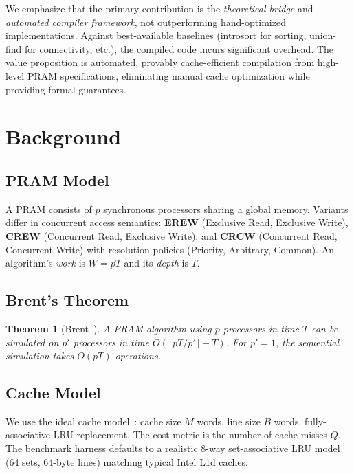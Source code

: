 \documentclass[11pt]{article}
\newtheorem{theorem}{Theorem}
\begin{document}
We emphasize that the primary contribution is the \emph{theoretical
bridge} and \emph{automated compiler framework}, not outperforming
hand-optimized implementations.  Against best-available baselines
(introsort for sorting, union-find for connectivity, etc.), the
compiled code incurs significant overhead.  The value proposition is
automated, provably cache-efficient compilation from high-level PRAM
specifications, eliminating manual cache optimization while providing
formal guarantees.

\section{Background}
\label{sec:background}

\subsection{PRAM Model}

A PRAM consists of $p$ synchronous processors sharing a global memory.
Variants differ in concurrent access semantics:
\textbf{EREW} (Exclusive Read, Exclusive Write),
\textbf{CREW} (Concurrent Read, Exclusive Write), and
\textbf{CRCW} (Concurrent Read, Concurrent Write) with resolution policies
(Priority, Arbitrary, Common).  An algorithm's \emph{work} is $W = pT$
and its \emph{depth} is $T$.

\subsection{Brent's Theorem}

\begin{theorem}[Brent~\cite{brent1974parallel}]
A PRAM algorithm using $p$ processors in time $T$ can be simulated on
$p'$ processors in time $O(\lceil pT/p' \rceil + T)$.  For $p' = 1$,
the sequential simulation takes $O(pT)$ operations.
\end{theorem}

\subsection{Cache Model}

We use the ideal cache model~\cite{frigo1999cache}: cache size $M$ words,
line size $B$ words, fully-associative LRU replacement.  The cost metric
is the number of cache misses $Q$.  The benchmark harness defaults to a
realistic 8-way set-associative LRU model (64 sets, 64-byte lines)
matching typical Intel L1d caches.
\end{document}
